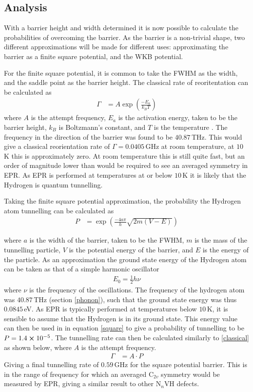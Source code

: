 \documentclass[10pt,a4paper,twocolumn,twoside]{extarticle}
\begin{document}
\subsection{Analysis}
With a barrier height and width determined it is now possible to calculate the probabilities of overcoming the barrier. As the barrier is a non-trivial shape, two different approximations will be made for different uses: approximating the barrier as a finite square potential, and the WKB potential. 

For the finite square potential, it is common to take the FWHM as the width, and the saddle point as the barrier height. The classical rate of reoritentation can be calculated as 
\begin{align}
    \label{classical}
    \Gamma &= A\exp({\frac{-E_a}{k_BT}})
\end{align}
where $A$ is the attempt frequency, $E_a$ is the activation energy, taken to be the barrier height, $k_B$ is Boltzmann's constant, and $T$ is the temperature \cite{Peaker}. The frequency in the direction of the barrier was found to be $40.87$\,THz. This would give a classical reorientation rate of $\Gamma = 0.0405$\,GHz at room temperature, at $10$\,K this is approximately zero. At room temperature this is still quite fast, but an order of magnitude lower than would be required to see an averaged symmetry in EPR. As EPR is performed at temperatures at or below $10$\,K it is likely that the Hydrogen is quantum tunnelling. 

Taking the finite square potential approximation, the probability the Hydrogen atom tunnelling can be calculated as 
\begin{align}
    \label{square}
    P &= \exp(\frac{-4a\pi}{h}\sqrt{2m(V-E)})
\end{align}

where $a$ is the width of the barrier, taken to be the FWHM, $m$ is the mass of the tunnelling particle, $V$ is the potential energy of the barrier, and $E$ is the energy of the particle. As an approximation the ground state energy of the Hydrogen atom can be taken as that of a simple harmonic oscillator 
\begin{align}
    E_0 = \frac{1}{2}h\nu
\end{align}
where $\nu$ is the frequency of the oscillations. The frequency of the hydrogen atom was $40.87$\,THz (section \ref{phonon}), such that the ground state energy was thus $0.0845$\,eV. As EPR is typically performed at temperatures below $10$\,K, it is sensible to assume that the Hydrogen is in its ground state. This energy value can then be used in in equation \ref{square} to give a probability of tunnelling to be $P = 1.4\cross10^{-5}$. The tunnelling rate can then be calculated similarly to \ref{classical} as shown below, where $A$ is the attempt frequency. 
\begin{align}
    \Gamma &= A\cdot P
\end{align}
Giving a final tunnelling rate of $0.59$\,GHz for the square potential barrier. This is in the range of frequency for which an averaged C$_{2v}$ symmetry would be measured by EPR, giving a similar result to other N$_{n}$VH defects.
\end{document}
